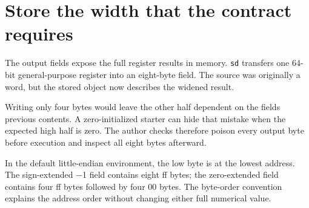 \section{Store the width that the contract
  requires}\label{004-bit-inspector-p06-store-the-width-that-the-contract-requires}

The output fields expose the full register results in memory.
\texttt{sd} transfers one 64-bit general-purpose register into an
eight-byte field. The source was originally a word, but the stored
object now describes the widened result.

Writing only four bytes would leave the other half dependent on the
field\textquotesingle s previous contents. A zero-initialized starter
can hide that mistake when the expected high half is zero. The author
checks therefore poison every output byte before execution and inspect
all eight bytes afterward.

In the default little-endian environment, the low byte is at the lowest
address. The sign-extended \ensuremath{-}1 field contains eight ff bytes; the
zero-extended field contains four ff bytes followed by four 00 bytes.
The byte-order convention explains the address order without changing
either full numerical value.
